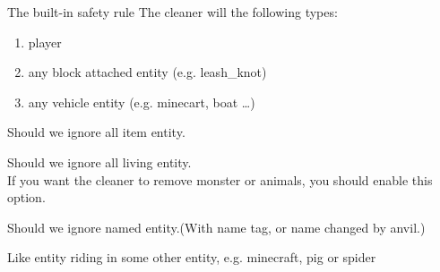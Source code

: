 \begin{samepage}
    \begin{note}{The built-in safety rule}
        The cleaner will  the following types:
        \begin{enumerate}
            \item player
            \item any block attached entity (e.g. leash\_knot)
            \item any vehicle entity (e.g. minecart, boat \ldots)
        \end{enumerate}
    \end{note}
\end{samepage}

Should we ignore all item entity.

Should we ignore all living entity.\\
If you want the cleaner to remove monster or animals, you should enable this option.

Should we ignore named entity.(With name tag, or name changed by anvil.)

Like entity riding in some other entity, e.g. minecraft, pig or spider



